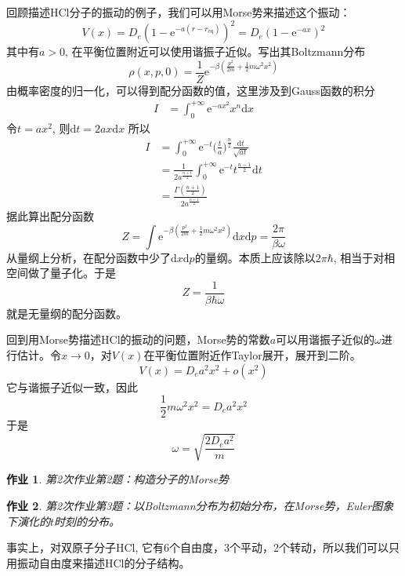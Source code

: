 \documentclass[12pt]{article}
\newtheorem{asg}{作业}
\begin{document}
    回顾描述HCl分子的振动的例子，我们可以用Morse势来描述这个振动：
    \begin{equation}
        V(x) = D_e (1- \mathrm{e}^{-a(r-r_\mathrm{eq})})^2 = D_e(1-\mathrm{e}^{-ax})^2
    \end{equation}
    其中有$a>0$, 在平衡位置附近可以使用谐振子近似。写出其Boltzmann分布
    \begin{equation}
        \rho(x,p,0) = \frac 1Z \mathrm{e}^{-\beta (\frac {p^2}{2m} + \frac 12 m\omega^2 x^2)} 
    \end{equation}
    由概率密度的归一化，可以得到配分函数的值，这里涉及到Gauss函数的积分
    \begin{equation}\begin{aligned}
        I &= \int_0^{+\infty} \mathrm{e}^{-ax^2} x^{n} \mathrm{d}x
    \end{aligned}\end{equation}
    令$t = ax^2$, 则$\mathrm{d}t = 2ax\mathrm{d}x$
    所以
    \begin{equation}\begin{aligned}
    I &= \int_0^{+\infty} \mathrm{e}^{-t} \bigg(\frac ta\bigg)^{\frac n2} \frac {\mathrm{d}t}{\sqrt{at}}\\
    &= \frac 1{2a^{\frac {n+1}2}} \int_0^{+\infty} \mathrm{e}^{-t} t^{\frac {n-1}2} \mathrm{d}t\\
    &= \frac {\Gamma(\frac {n+1}2)}{2a^{\frac {n+1}2}}
    \end{aligned}\end{equation}
    据此算出配分函数
    \begin{equation}
        Z = \int \mathrm{e}^{-\beta (\frac {p^2}{2m} + \frac 12 m\omega^2 x^2)} \mathrm{d}x\mathrm{d}p = \frac {2\pi}{\beta \omega}
    \end{equation}
    从量纲上分析，在配分函数中少了$\mathrm{d}x\mathrm{d}p$的量纲。本质上应该除以$2\pi\hbar$, 相当于对相空间做了量子化。于是
    \begin{equation}
        Z = \frac 1{\beta \hbar \omega}
    \end{equation}
    就是无量纲的配分函数。

    回到用Morse势描述HCl的振动的问题，Morse势的常数$a$可以用谐振子近似的$\omega$进行估计。令$x \to 0 $，对$V(x)$在平衡位置附近作Taylor展开，展开到二阶。
    \begin{equation}
        V(x) = D_e a^2 x^2 + o(x^2)
    \end{equation}
    它与谐振子近似一致，因此
    \begin{equation}
        \frac 12 m\omega^2x^2 = D_e a^2 x^2
    \end{equation}
    于是
    \begin{equation}
        \omega = \sqrt{\frac {2D_ea^2}m}
    \end{equation}
    \begin{asg}
        第2次作业第2题：构造分子的Morse势
    \end{asg}
    \begin{asg}
        第2次作业第3题：以Boltzmann分布为初始分布，在Morse势，Euler图象下演化的$t$时刻的分布。
    \end{asg}
    事实上，对双原子分子HCl, 它有6个自由度，3个平动，2个转动，所以我们可以只用振动自由度来描述HCl的分子结构。
\end{document}
